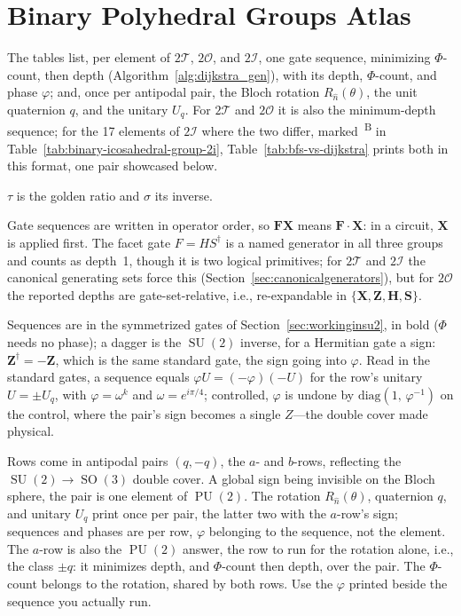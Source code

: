 \documentclass[11pt, oneside, openany]{scrbook}
\DeclareMathOperator{\SU}{SU}
\DeclareMathOperator{\SO}{SO}
\DeclareMathOperator{\PU}{PU}
\newcommand{\Tgroup}{\mathcal{T}}  %
\newcommand{\Ogroup}{\mathcal{O}}  %
\newcommand{\Igroup}{\mathcal{I}}  %
\newcommand{\TwoT}{2\Tgroup}
\newcommand{\TwoO}{2\Ogroup}
\newcommand{\TwoI}{2\Igroup}
\newcommand{\phig}{\tau} %
\newcommand{\invphig}{\sigma} %
\begin{document}
\appendix
\chapter{Binary Polyhedral Groups Atlas} \label{app:atlas}

The tables list, per element of $\TwoT$, $\TwoO$, and $\TwoI$, one gate sequence, minimizing $\Phi$-count, then depth (Algorithm~\ref{alg:dijkstra_gen}), with its depth, $\Phi$-count, and phase $\varphi$; and, once per antipodal pair, the Bloch rotation $R_{\hat{n}}(\theta)$, the unit quaternion $q$, and the unitary $U_q$. For $\TwoT$ and $\TwoO$ it is also the minimum-depth sequence; for the 17 elements of $\TwoI$ where the two differ, marked~\textsuperscript{B} in Table~\ref{tab:binary-icosahedral-group-2i}, Table~\ref{tab:bfs-vs-dijkstra} prints both in this format, one pair showcased below.

$\phig$ is the golden ratio and $\invphig$ its inverse.

Gate sequences are written in operator order, so $\mathbf{F}\mathbf{X}$ means $\mathbf{F} \cdot \mathbf{X}$: in a circuit, $\mathbf{X}$ is applied first. The facet gate $F = HS^\dagger$ is a named generator in all three groups and counts as depth~1, though it is two logical primitives; for $\TwoT$ and $\TwoI$ the canonical generating sets force this (Section~\ref{sec:canonicalgenerators}), but for $\TwoO$ the reported depths are gate-set-relative, i.e., re-expandable in $\{\mathbf{X}, \mathbf{Z}, \mathbf{H}, \mathbf{S}\}$.

Sequences are in the symmetrized gates of Section~\ref{sec:workinginsu2}, in bold ($\Phi$ needs no phase); a dagger is the $\SU(2)$ inverse, for a Hermitian gate a sign: $\mathbf{Z}^\dagger = -\mathbf{Z}$, which is the same standard gate, the sign going into $\varphi$. Read in the standard gates, a sequence equals $\varphi U = (-\varphi)(-U)$ for the row's unitary $U = \pm U_q$, with $\varphi = \omega^k$ and $\omega = e^{i\pi/4}$; controlled, $\varphi$ is undone by $\mathrm{diag}(1,\, \varphi^{-1})$ on the control, where the pair's sign becomes a single $Z$---the double cover made physical.

Rows come in antipodal pairs $(q, -q)$, the $a$- and $b$-rows, reflecting the $\SU(2) \to \SO(3)$ double cover. A global sign being invisible on the Bloch sphere, the pair is one element of $\PU(2)$. The rotation $R_{\hat{n}}(\theta)$, quaternion $q$, and unitary $U_q$ print once per pair, the latter two with the $a$-row's sign; sequences and phases are per row, $\varphi$ belonging to the sequence, not the element. The $a$-row is also the $\PU(2)$ answer, the row to run for the rotation alone, i.e., the class $\pm q$: it minimizes depth, and $\Phi$-count then depth, over the pair. The $\Phi$-count belongs to the rotation, shared by both rows. Use the $\varphi$ printed beside the sequence you actually run.
\end{document}
